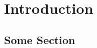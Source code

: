 
\chapter{Introduction}
\label{ch:Introduction}

\section{Some Section}
\label{sec:SomeSection}

\endinput

Any text after an \endinput is ignored.
You could put scraps here or things in progress.
